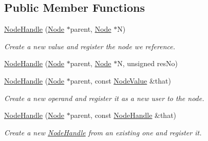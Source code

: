 \subsection*{Public Member Functions}
\begin{DoxyCompactItemize}
\item 
\mbox{\label{structglow_1_1_node_handle_a172e2db59fb9be128977de0527922048}} 
\hyperlink{structglow_1_1_node_handle_a172e2db59fb9be128977de0527922048}{Node\+Handle} (\hyperlink{classglow_1_1_node}{Node} $\ast$parent, \hyperlink{classglow_1_1_node}{Node} $\ast$N)
\begin{DoxyCompactList}\small\item\em Create a new value and register the node we reference. \end{DoxyCompactList}\item 
\hyperlink{structglow_1_1_node_handle_ada61f6b4c842e7911d221dac609c69c2}{Node\+Handle} (\hyperlink{classglow_1_1_node}{Node} $\ast$parent, \hyperlink{classglow_1_1_node}{Node} $\ast$N, unsigned res\+No)
\item 
\mbox{\label{structglow_1_1_node_handle_a9e59215aee87a3e0af80a6f506c81d2f}} 
\hyperlink{structglow_1_1_node_handle_a9e59215aee87a3e0af80a6f506c81d2f}{Node\+Handle} (\hyperlink{classglow_1_1_node}{Node} $\ast$parent, const \hyperlink{structglow_1_1_node_value}{Node\+Value} \&that)
\begin{DoxyCompactList}\small\item\em Create a new operand and register it as a new user to the node. \end{DoxyCompactList}\item 
\mbox{\label{structglow_1_1_node_handle_aa7efaaf73277a56d20716f621096fe2e}} 
\hyperlink{structglow_1_1_node_handle_aa7efaaf73277a56d20716f621096fe2e}{Node\+Handle} (\hyperlink{classglow_1_1_node}{Node} $\ast$parent, const \hyperlink{structglow_1_1_node_handle}{Node\+Handle} \&that)
\begin{DoxyCompactList}\small\item\em Create a new \hyperlink{structglow_1_1_node_handle}{Node\+Handle} from an existing one and register it. \end{DoxyCompactList}\item 
\mbox{\label{structglow_1_1_node_handle_a4eac1ac7ee0f665c0ef7f28426dc31a7}} 

\end{DoxyCompactItemize}
